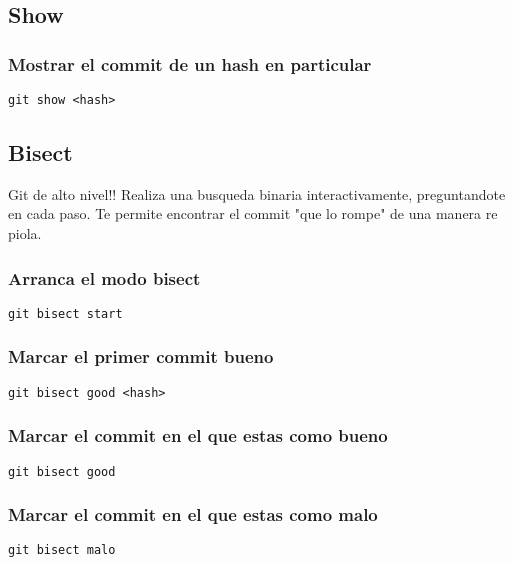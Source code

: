 \documentclass[11pt]{article}
\begin{document}
\subsection{Show}
\label{sec:org36ed0ee}
\subsubsection{Mostrar el commit de un hash en particular}
\label{sec:org73d7401}
\begin{verbatim}
git show <hash>
\end{verbatim}

\subsection{Bisect}
\label{sec:orga6204ca}
Git de alto nivel!! Realiza una busqueda binaria interactivamente, preguntandote en cada paso. Te permite encontrar el commit "que lo rompe" de una manera re piola.

\subsubsection{Arranca el modo bisect}
\label{sec:orgaa1da55}
\begin{verbatim}
git bisect start
\end{verbatim}

\subsubsection{Marcar el primer commit bueno}
\label{sec:org0a6aea5}
\begin{verbatim}
git bisect good <hash>
\end{verbatim}

\subsubsection{Marcar el commit en el que estas como bueno}
\label{sec:org505c30c}
\begin{verbatim}
git bisect good
\end{verbatim}

\subsubsection{Marcar el commit en el que estas como malo}
\label{sec:org67a8a3c}
\begin{verbatim}
git bisect malo
\end{verbatim}
\end{document}
